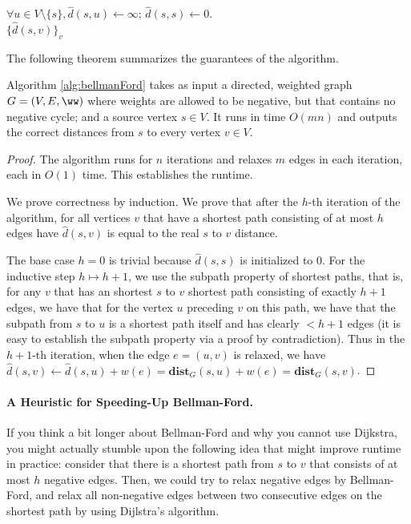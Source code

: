 \begin{algorithm}
$\forall u \in V \setminus \{s\}, \hat{d}(s, u) \gets \infty$; $\hat{d}(s,s) \gets 0$.\\
\Return $\{\hat{d}(s, v) \}_v$
\caption{$\textsc{BellmanFord}(G,s)$}
\label{alg:bellmanFord}
\end{algorithm}

The following theorem summarizes the guarantees of the algorithm.

\begin{theorem}
Algorithm \ref{alg:bellmanFord} takes as input a directed, weighted graph $G=(V,E, \ww)$ where weights are allowed to be negative, but that contains no negative cycle; and a source vertex $s \in V$. It runs in time $O(mn)$ and outputs the correct distances from $s$ to every vertex $v \in V$. 
\end{theorem}
\begin{proof}
The algorithm runs for $n$ iterations and relaxes $m$ edges in each iteration, each in $O(1)$ time. This establishes the runtime.

We prove correctness by induction. We prove that after the $h$-th iteration of the algorithm, for all vertices $v$ that have a shortest path consisting of at most $h$ edges have $\hat{d}(s,v)$ is equal to the real $s$ to $v$ distance.

The base case $h = 0$ is trivial because $\hat{d}(s,s)$ is initialized to $0$. For the inductive step $h \mapsto h+1$, we use the subpath property of shortest paths, that is, for any $v$ that has an shortest $s$ to $v$ shortest path consisting of exactly $h+1$ edges, we have that for the vertex $u$ preceding $v$ on this path, we have that the subpath from $s$ to $u$ is a shortest path itself and has clearly $<h+1$ edges (it is easy to establish the subpath property via a proof by contradiction). Thus in the $h+1$-th iteration, when the edge $e = (u,v)$ is relaxed, we have $\hat{d}(s, v) \gets \hat{d}(s, u) + w(e)= \mathbf{dist}_G(s,u) + w(e) = \mathbf{dist}_G(s,v)$.
\end{proof}

\paragraph{A Heuristic for Speeding-Up Bellman-Ford.} If you think a bit longer about Bellman-Ford and why you cannot use Dijkstra, you might actually stumble upon the following idea that might improve runtime in practice: consider that there is a shortest path from $s$ to $v$ that consists of at most $h$ negative edges. Then, we could try to relax negative edges by Bellman-Ford, and relax all non-negative edges between two consecutive edges on the shortest path by using Dijlstra's algorithm.  

